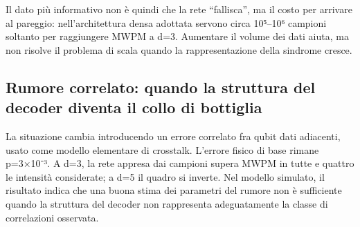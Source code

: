Il dato più informativo non è quindi che la rete ``fallisca'', ma il costo per arrivare al pareggio: nell'architettura densa adottata servono circa 10⁵--10⁶ campioni soltanto per raggiungere MWPM a d=3. Aumentare il volume dei dati aiuta, ma non risolve il problema di scala quando la rappresentazione della sindrome cresce.

\subsection{Rumore correlato: quando la struttura del decoder diventa il collo di bottiglia}\label{sec:finale_5_3_2}

La situazione cambia introducendo un errore correlato fra qubit dati adiacenti, usato come modello elementare di crosstalk. L'errore fisico di base rimane p=3×10⁻³. A d=3, la rete appresa dai campioni supera MWPM in tutte e quattro le intensità considerate; a d=5 il quadro si inverte. Nel modello simulato, il risultato indica che una buona stima dei parametri del rumore non è sufficiente quando la struttura del decoder non rappresenta adeguatamente la classe di correlazioni osservata.

